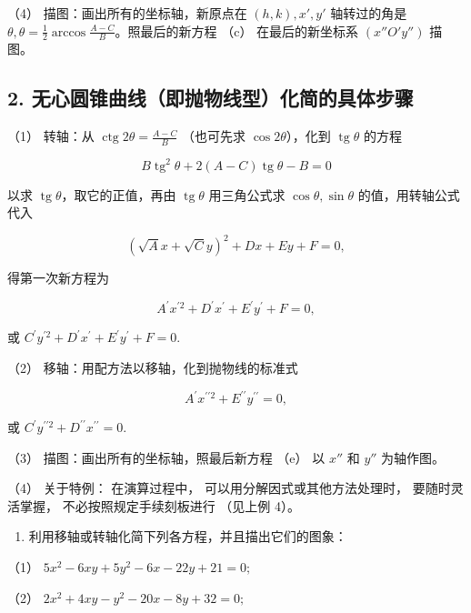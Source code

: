 （4） 描图：画出所有的坐标轴，新原点在 \((h, k), x', y'\) 轴转过的角是
\(\theta, \theta = \frac{1}{2} \arccos \frac{A - C}{B}\)。照最后的新方程
（c） 在最后的新坐标系 \((x''O'y'')\) 描图。

\subsection{2.
无心圆锥曲线（即抛物线型）化简的具体步骤}\label{ux65e0ux5fc3ux5706ux9525ux66f2ux7ebfux5373ux629bux7269ux7ebfux578bux5316ux7b80ux7684ux5177ux4f53ux6b65ux9aa4}

（1） 转轴：从 \(\operatorname{ctg} 2\theta = \frac{A - C}{B}\)
（也可先求 \(\cos 2\theta\)），化到 \(\operatorname{tg} \theta\) 的方程

\[
B \operatorname{tg} ^ {2} \theta + 2 (A - C) \operatorname{tg} \theta - B = 0
\]

以求 \(\operatorname{tg} \theta\)，取它的正值，再由
\(\operatorname{tg} \theta\) 用三角公式求 \(\cos \theta, \sin \theta\)
的值，用转轴公式代入

\[
(\sqrt {A} x + \sqrt {C} y) ^ {2} + D x + E y + F = 0, \tag {5}
\]

得第一次新方程为

\[
A^{\prime} x^{\prime 2} + D^{\prime} x^{\prime} + E^{\prime} y^{\prime} + F = 0, \tag {d}
\]

或
\(C^{\prime}y^{\prime 2} + D^{\prime}x^{\prime} + E^{\prime}y^{\prime} + F = 0.\)

（2） 移轴：用配方法以移轴，化到抛物线的标准式

\[
A^{\prime} x^{\prime \prime 2} + E^{\prime \prime} y^{\prime \prime} = 0, \tag {e}
\]

或
\(C^{\prime}y^{\prime\prime 2} + D^{\prime\prime}x^{\prime\prime} = 0.\)

（3） 描图：画出所有的坐标轴，照最后新方程 （e） 以 \(x''\) 和 \(y''\)
为轴作图。

（4） 关于特例： 在演算过程中， 可以用分解因式或其他方法处理时，
要随时灵活掌握， 不必按照规定手续刻板进行 （见上例 4）。

\begin{enumerate}
\def\labelenumi{\arabic{enumi}.}
\tightlist
\item
  利用移轴或转轴化简下列各方程，并且描出它们的图象：
\end{enumerate}

（1） \(5x^{2} - 6xy + 5y^{2} - 6x - 22y + 21 = 0;\)

（2） \(2x^{2}+4xy-y^{2}-20x-8y+32=0;\)

